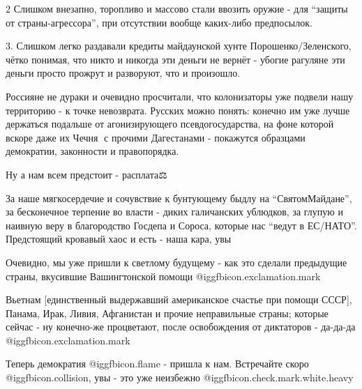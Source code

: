 2 Слишком внезапно, торопливо и массово стали ввозить оружие - для \enquote{защиты от
страны-агрессора}, при отсутствии вообще каких-либо предпосылок.

3. Слишком легко раздавали кредиты майдаунской хунте Порошенко/Зеленского,
чётко понимая, что никто и никогда эти деньги не вернёт - убогие рагуляне эти
деньги просто прожрут и разворуют, что и произошло.

Россияне не дураки и очевидно просчитали, что колонизаторы уже подвели нашу
территорию - к точке невозврата.  Русских можно понять: конечно им уже лучше
держаться подальше от агонизирующего псевдогосударства, на фоне которой вскоре
даже их Чечня👳 с прочими Дагестанами - покажутся образцами демократии,
законности и правопорядка.

Ну а нам всем предстоит - расплата⚖️

За наше мягкосердечие и сочувствие к бунтующему быдлу на \enquote{СвятомМайдане}, за
бесконечное терпение во власти - диких галичанских ублюдков, за глупую и
наивную веру в благородство Госдепа и Сороса, которые нас \enquote{ведут в ЕС/НАТО}.
Предстоящий кровавый хаос и есть - наша кара, увы 💁

Очевидно, мы уже пришли к светлому будущему - как это сделали предыдущие
страны, вкусившие Вашингтонской помощи @igg{fbicon.exclamation.mark}

Вьетнам [единственный выдержавший американское счастье при помощи СССР],
Панама, Ирак, Ливия, Афганистан и прочие неправильные страны; которые сейчас -
ну конечно-же процветают, после освобождения от диктаторов - да-да-да
@igg{fbicon.exclamation.mark}

Теперь демократия @igg{fbicon.flame}  - пришла к нам.  Встречайте скоро
@igg{fbicon.collision}, увы - это уже неизбежно
@igg{fbicon.check.mark.white.heavy} 
